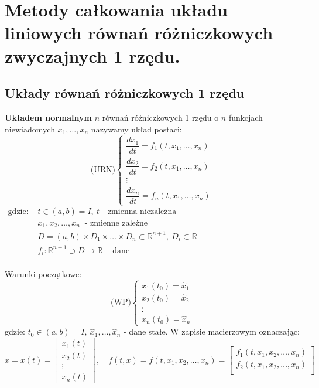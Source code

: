 \chapter{Metody całkowania układu liniowych równań różniczkowych zwyczajnych 1 rzędu.}

\section{Układy równań różniczkowych 1 rzędu}

\begin{df}
\textbf{Układem normalnym} $n$ równań różniczkowych 1 rzędu o $n$ funkcjach niewiadomych $x_1,\ldots,x_n$ nazywamy układ postaci:
$$\textrm{(URN)}
\left\{\begin{array}{c}
\dfrac{dx_1}{dt}=f_1(t,x_1,\ldots,x_n)\\
\dfrac{dx_2}{dt}=f_2(t,x_1,\ldots,x_n)\\
\vdots\\
\dfrac{dx_n}{dt}=f_n(t,x_1,\ldots,x_n)
\end{array}\right.$$
$\begin{array}{ll}
\textrm{gdzie: } & t\in (a,b)=I,\ t\textrm{ - zmienna niezależna}\\
& x_1,x_2,\ldots,x_n\ \textrm{ - zmienne zależne}\\
& D=(a,b)\times D_1\times\ldots\times D_n\subset\mathbb{R}^{n+1},\ D_i\subset\mathbb{R}\\
& f_i:\mathbb{R}^{n+1}\supset D\rightarrow\mathbb{R}\ \textrm{ - dane}
\end{array}$\\
\\
Warunki początkowe:
$$\textrm{(WP)}
\left\{\begin{array}{c}
x_1(t_0)=\hat{x}_1\\
x_2(t_0)=\hat{x}_2\\
\vdots\\
x_n(t_0)=\hat{x}_n
\end{array}\right.$$
gdzie: $t_0\in (a,b)=I,\ \hat{x}_1,\ldots,\hat{x}_n$ - dane stałe. W zapisie macierzowym oznaczając:
$$x=x(t)=
\begin{bmatrix}
x_1(t)\\
x_2(t)\\
\vdots\\
x_n(t)
\end{bmatrix},\quad f(t,x)=f(t,x_1,x_2,\ldots,x_n)=
\begin{bmatrix}
f_1(t,x_1,x_2,\ldots,x_n)\\
f_2(t,x_1,x_2,\ldots,x_n)\\

\end{bmatrix}$$
\end{df}
